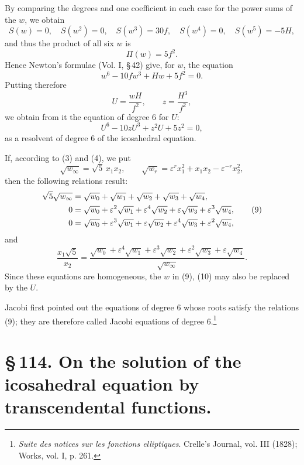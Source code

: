 \documentclass[11pt]{article}
\providecommand{\eps}{\varepsilon}
\providecommand{\eps}{\varepsilon}
\begin{document}
By comparing the degrees and one coefficient in each case for the power sums of the \(w\), we obtain
\[
S(w)=0,
\quad
S(w^2)=0,
\quad
S(w^3)=30f,
\quad
S(w^4)=0,
\quad
S(w^5)=-5H,
\]
and thus the product of all six \(w\) is
\[
\Pi(w)=5f^2.
\]
Hence Newton's formulae (Vol. I, \S\,42) give, for \(w\), the equation
\begin{equation}
w^6-10fw^3+Hw+5f^2=0.
\tag{5}
\end{equation}
Putting therefore
\begin{equation}
U=\frac{wH}{f^2},
\qquad
z=\frac{H^3}{f^2},
\tag{6}
\end{equation}
we obtain from it the equation of degree 6 for \(U\):
\begin{equation}
U^6-10zU^3+z^2U+5z^2=0,
\tag{7}
\end{equation}
as a resolvent of degree 6 of the icosahedral equation.

If, according to (3) and (4), we put
\begin{equation}
\sqrt{w_\infty}=\sqrt5\,x_1x_2,
\qquad
\sqrt{w_r}=\eps^r x_1^2+x_1x_2-\eps^{-r}x_2^2,
\tag{8}
\end{equation}
then the following relations result:
\begin{align}
\sqrt5\sqrt{w_\infty}&=\sqrt{w_0}+\sqrt{w_1}+\sqrt{w_2}+\sqrt{w_3}+\sqrt{w_4},\notag\\
0&=\sqrt{w_0}+\eps^2\sqrt{w_1}+\eps^4\sqrt{w_2}+\eps\sqrt{w_3}+\eps^3\sqrt{w_4},\tag{9}\\
0&=\sqrt{w_0}+\eps^3\sqrt{w_1}+\eps\sqrt{w_2}+\eps^4\sqrt{w_3}+\eps^2\sqrt{w_4},\notag
\end{align}
and
\begin{equation}
\frac{x_1\sqrt5}{x_2}=\frac{\sqrt{w_0}+\eps^4\sqrt{w_1}+\eps^3\sqrt{w_2}+\eps^2\sqrt{w_3}+\eps\sqrt{w_4}}{\sqrt{w_\infty}}.
\tag{10}
\end{equation}
Since these equations are homogeneous, the \(w\) in (9), (10) may also be replaced by the \(U\).

Jacobi first pointed out the equations of degree 6 whose roots satisfy the relations (9); they are therefore called Jacobi equations of degree 6.\footnote{\emph{Suite des notices sur les fonctions elliptiques}. Crelle's Journal, vol. III (1828); Works, vol. I, p. 261.}

\section*{\S\,114. On the solution of the icosahedral equation by transcendental functions.}
\end{document}

